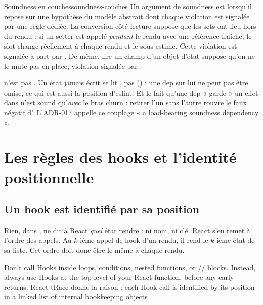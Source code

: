 \begin{definition}{Soundness en couches}{soundness-couches}
Un argument de soundness est  lorsqu'il repose sur une
hypothèse du modèle abstrait dont chaque violation est signalée par une règle
dédiée. La conversion côté lecture suppose que les sets ont lieu hors du rendu :
si un setter est appelé \emph{pendant} le rendu avec une référence fraîche, le
slot change réellement à chaque rendu et  le sous-estime. Cette
violation est signalée à part par . De même, lire un
champ d'un objet d'état suppose qu'on ne le mute pas en place, violation
signalée par .
\end{definition}

\begin{piege}
 n'est pas . Un état jamais écrit se lit
, pas  () : une dep sur lui ne peut pas
être omise, ce qui est aussi la position d'eslint. Et le fait qu'une dep
 « garde » un effet dans  n'est sound
qu'\emph{avec} le bras churn : retirer l'un sans l'autre rouvre le faux négatif
d'. L'ADR-017 appelle ce couplage « a load-bearing soundness
dependency ».
\end{piege}

\section{Les règles des hooks et l'identité positionnelle}
\label{sec:react-modele-regles-hooks}

\subsection{Un hook est identifié par sa position}

Rien, dans , ne dit à React \emph{quel} état
rendre : ni nom, ni clé. React s'en remet à l'ordre des appels. Au $k$-ième
appel de hook d'un rendu, il rend le $k$-ième état de sa liste. Cet ordre doit
donc être le même à chaque rendu.

\begin{react}
\og Don't call Hooks inside loops, conditions, nested functions, or
// blocks. Instead, always use Hooks at the
top level of your React function, before any early returns.\fg{}
\cite{ReactRulesOfHooks} React-tRace donne la raison : \og each Hook call is
identified by its position in a linked list of internal bookkeeping
objects\fg{} \cite{LeeAhnYi2025}.
\end{react}

